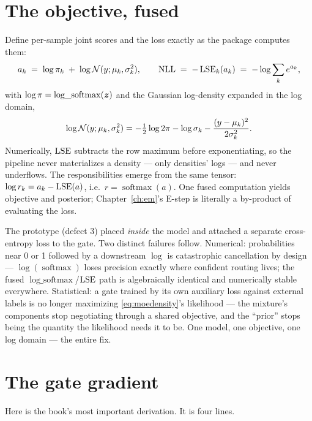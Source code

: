 \section{The objective, fused}\label{sec:fusedobjective}

Define per-sample joint scores and the loss exactly as the package
computes them:
\begin{equation}\label{eq:fused}
  a_k \;=\; \log \pi_k \;+\; \log \mathcal{N}(y; \mu_k, \sigma_k^2),
  \qquad
  \mathrm{NLL} \;=\; -\operatorname{LSE}_k(a_k) \;=\; -\log \sum_k e^{a_k},
\end{equation}
with $\log \pi = \operatorname{log\_softmax}(\bm{z})$ and the Gaussian
log-density expanded in the log domain,
\[
  \log \mathcal{N}(y; \mu_k, \sigma_k^2)
  = -\tfrac12 \log 2\pi - \log \sigma_k
    - \frac{(y - \mu_k)^2}{2\sigma_k^2}.
\]
Numerically, $\operatorname{LSE}$ subtracts the row maximum before exponentiating, so
the pipeline never materializes a density --- only densities' logs ---
and never underflows. The responsibilities emerge from the same tensor:
$\log r_k = a_k - \operatorname{LSE}(a)$, i.e.\ $r = \operatorname{softmax}(a)$. One
fused computation yields objective and posterior; Chapter~\ref{ch:em}'s
E-step is literally a by-product of evaluating the loss.

\begin{whatbreaks}
The prototype (defect 3) placed  \emph{inside} the model
and attached a separate cross-entropy loss to the gate. Two distinct
failures follow. Numerical: probabilities near 0 or 1 followed by a
downstream $\log$ is catastrophic cancellation by design ---
$\log(\operatorname{softmax})$ loses precision exactly where confident
routing lives; the fused $\operatorname{log\_softmax}$/$\operatorname{LSE}$ path is
algebraically identical and numerically stable everywhere. Statistical:
a gate trained by its own auxiliary loss against external labels is no
longer maximizing \eqref{eq:moedensity}'s likelihood --- the mixture's
components stop negotiating through a shared objective, and the ``prior''
stops being the quantity the likelihood needs it to be. One model, one
objective, one log domain --- the entire fix.
\end{whatbreaks}

\section{The gate gradient}\label{sec:gategradient}

Here is the book's most important derivation. It is four lines.

